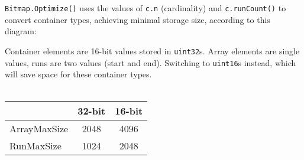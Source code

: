 \documentclass{article} %
\begin{document}
\texttt{Bitmap.Optimize()} uses the values of \texttt{c.n} (cardinality) and
\texttt{c.runCount()} to convert container types, achieving minimal storage size, according to this diagram:\\


\bigskip


Container elements are 16-bit values stored in \texttt{uint32}s. Array elements are
single values, runs are two values (start and end). Switching to \texttt{uint16}s
instead, which will save space for these container types.\\
\\
\begin{tabular}{l | c | c}
    & 32-bit & 16-bit \\
  \hline
  ArrayMaxSize & 2048 & 4096 \\
  \hline
  RunMaxSize & 1024 & 2048 \\
\end{tabular}
\end{document}
